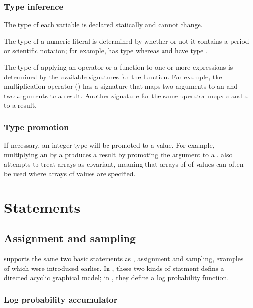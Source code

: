 \documentclass[article]{jss}
\begin{document}
\subsubsection{Type inference}

The type of each variable is declared statically and cannot change.  

The type of a numeric literal is determined by whether or not it
contains a period or scientific notation; for example,  has
type  whereas  and  have type
.

The type of applying an operator or a function to one or more
expressions is determined by the available signatures for the
function.  For example, the multiplication operator (\code{*}) has a
signature that maps two  arguments to an  and two
 arguments to a  result.  Another signature for
the same operator maps a  and a  to a
 result.

\subsubsection{Type promotion}

If necessary, an integer type will be promoted to a  value.
For example, multiplying an  by a  produces a
 result by promoting the  argument to a
.   also attempts to treat arrays as
covariant, meaning that arrays of of  values can often be
used where arrays of  values are specified.

\section{Statements}

\subsection{Assignment and sampling}

 supports the same two basic statements as
, assignment and sampling, examples of which were
introduced earlier.  In , these two kinds of statment
define a directed acyclic graphical model; in , they
define a log probability function. 

\subsubsection{Log probability accumulator}
\end{document}
